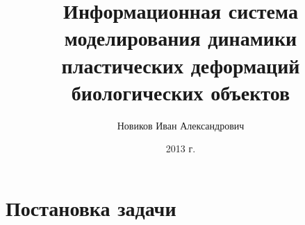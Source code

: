 \documentclass[usenames,dvipsnames,pdftex,unicode,hidelinks]{beamer}
\title[Система моделирования пластических деформаций биологических объектов]{Информационная система моделирования динамики пластических деформаций биологических объектов}
\author[Иван Новиков]{Новиков Иван Александрович}
\institute{Н1: Информационные технологии}
\date{ 2013 г. }
\begin{document}
  
  {
    \begin{frame}[plain]
      \titlepage
    \end{frame}
  }

  \section{Постановка задачи}
\end{document}
